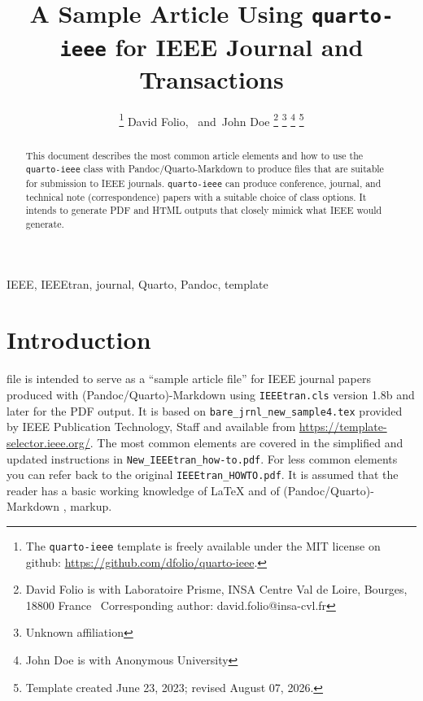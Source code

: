 \documentclass[
  journal,
]{IEEEtran}%
\title{A Sample Article Using \texttt{quarto-ieee} for IEEE Journal and
Transactions}
\author{
\thanks{The \texttt{quarto-ieee} template is freely available under the
MIT license on github: \url{https://github.com/dfolio/quarto-ieee}.}
David Folio\orcidlink{0000-0001-9430-6091},~\IEEEmembership{Member,
IEEE}
and~John Doe%
\thanks{David Folio is with Laboratoire Prisme, INSA Centre Val de
Loire, Bourges, 18800 France%
  Corresponding author: david.folio@insa-cvl.fr
}
\thanks{Unknown affiliation}
\thanks{John Doe is with Anonymous University%
}
\thanks{Template created June 23, 2023; revised August 07, 2026.}
}
\theoremstyle{plain}
\theoremstyle{remark}
\begin{document}


\maketitle

\begin{abstract}
This document describes the most common article elements and how to use
the \texttt{quarto-ieee} class with Pandoc/Quarto-Markdown to produce
files that are suitable for submission to IEEE journals.
\texttt{quarto-ieee} can produce conference, journal, and technical note
(correspondence) papers with a suitable choice of class options. It
intends to generate PDF and HTML outputs that closely mimick what IEEE
would generate.
\end{abstract}
\begin{IEEEkeywords}
IEEE, IEEEtran, journal, Quarto, Pandoc, template
\end{IEEEkeywords}

%


\section{Introduction}\label{sec-intro}

 file is intended to serve as a ``sample article
file'' for IEEE journal papers produced with (Pandoc/Quarto)-Markdown
using \texttt{IEEEtran.cls} version 1.8b and later for the PDF output.
It is based on \texttt{bare\_jrnl\_new\_sample4.tex} provided by IEEE
Publication Technology, Staff and available from
\url{https://template-selector.ieee.org/}. The most common elements are
covered in the simplified and updated instructions in
\texttt{New\_IEEEtran\_how-to.pdf}. For less common elements you can
refer back to the original \texttt{IEEEtran\_HOWTO.pdf}. It is assumed
that the reader has a basic working knowledge of {\LaTeX}
 and of
(Pandoc/Quarto)-Markdown ,
 markup.
\end{document}
